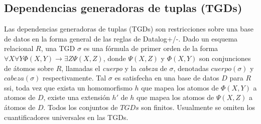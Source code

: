\documentclass[11pt,a4paper,twoside]{tesis}
\newtheorem{exmp}{Ejemplo}
\begin{document}
\subsection{Dependencias generadoras de tuplas (TGDs)}
Las dependencias generadoras de tuplas (TGDs) son restricciones sobre una base de datos en la forma general de las reglas de Datalog+/-.
Dado un esquema relacional $R$, una TGD $\sigma$ es una fórmula de primer orden de la forma $\forall X \forall Y \Phi (X, Y) \rightarrow \exists Z \Psi (X, Z)$, donde $ \Psi (X, Z)$ y $\Phi (X, Y)$ son conjunciones de átomos sobre $R$, llamadas el \textit{cuerpo} y la \textit{cabeza} de $\sigma$, denotadas $cuerpo(\sigma)$ y $cabeza(\sigma)$ respectivamente. Tal $\sigma$ es satisfecha en una base de datos $D$ para $R$ ssi, toda vez que exista un homomorfismo $h$ que mapea los atomos de $\Phi(X, Y)$ a atomos de $D$, existe una extensión $h\prime$ de $h$ que mapea los atomos de $\Psi (X, Z)$ a átomos de $D$. Todos los conjuntos de $TGDs$ son finitos. Usualmente se omiten los cuantificadores universales en las TGDs.
\iffalse
\begin{exmp}
{\rb
    Tomando en cuenta el ejemplo anterior, un posible conjunto de TGDs parar $R$ puede estar dado por $\Sigma = \{\forall X pelicula(X) \rightarrow \exists Z dirigidaPor(X, Z), 
    \forall X \forall Y \forall W actuaEn(X, Y) \land dirigidaPor(X, W) \rightarrow \trabajaronJuntos(Y, W) \}$
    }
\end{exmp}   
\fi
\end{document}
